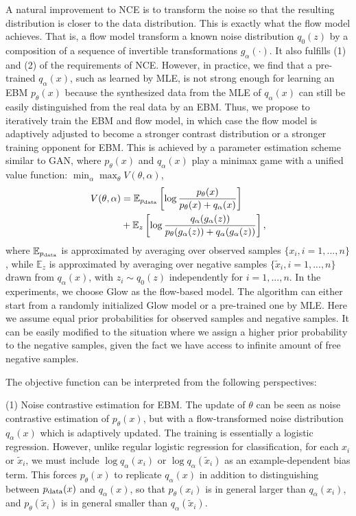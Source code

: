 \documentclass[10pt,twocolumn,letterpaper]{article}
\newcommand{\E}{\mathbb{E}}
\begin{document}
A natural improvement to NCE is to transform the noise so that the resulting distribution is closer to the data distribution. This is exactly what the flow model achieves. That is, a flow model transform a known noise distribution $q_0(z)$ by a composition of a sequence of invertible transformations $g_\alpha(\cdot)$. It also fulfills (1) and (2) of the requirements of NCE. However, in practice, we find that a pre-trained $q_\alpha(x)$, such as learned by MLE, is not strong enough for learning an EBM $p_\theta(x)$ because the synthesized data from the MLE of $q_\alpha(x)$ can still be easily distinguished from the real data by an EBM. Thus, we propose to iteratively train the EBM and flow model, in which case the flow model is adaptively adjusted to become a stronger contrast distribution or a stronger training opponent for EBM. This is achieved by a parameter estimation scheme similar to GAN, where $p_\theta(x)$ and $q_\alpha(x)$ play a minimax game with a unified value function: $ \min_{\alpha}\max_{\theta} V(\theta, \alpha)$, 
\begin{equation}
\begin{split}
	 V(\theta, \alpha) &=  \E_{p_{\rm data}}  \left[ \log \frac{p_\theta(x)}{p_\theta(x) +  q_\alpha(x)}\right] \\
	  &+  \E_{z}\left[\log \frac{q_\alpha(g_\alpha(z))}{p_\theta(g_\alpha(z)) + q_\alpha(g_\alpha(z))}\right],
\end{split}
\label{eqn: value}
\end{equation}
  where $\E_{p_{\rm data}}$ is approximated by averaging over observed samples $\{x_i, i = 1,...,n\}$, while $\E_z$ is approximated by averaging over negative samples $\{\tilde{x}_i, i = 1,...,n\}$ drawn from $q_\alpha(x)$, with $z_i \sim q_0(z)$ independently for $i = 1, ..., n$. In the experiments, we choose Glow \cite{kingma2018Glow} as the flow-based model. The algorithm can either start from a randomly initialized Glow model or a pre-trained one by MLE. Here we assume equal prior probabilities for observed samples and negative samples. It can be easily modified to the situation where we assign a higher prior probability to the negative samples, given the fact we have access to infinite amount of free negative samples. 

The objective function can be interpreted from the following perspectives:

(1) Noise contrastive estimation for EBM. The update of $\theta$ can be seen as noise contrastive estimation of $p_\theta(x)$, but with a flow-transformed noise distribution $q_\alpha(x)$ which is adaptively updated. The training is essentially a logistic regression. However, unlike regular logistic regression for classification, for each $x_i$ or $\tilde{x}_i$, we must include $\log q_\alpha(x_i)$ or $\log q_\alpha(\tilde{x}_i)$ as an example-dependent bias term. This forces $p_\theta(x)$ to replicate $q_\alpha(x)$ in addition to distinguishing between $p_{\rm data}(x)$ and $q_\alpha(x)$, so that $p_\theta(x_i)$ is in general larger than $q_\alpha(x_i)$, and $p_\theta(\tilde{x}_i)$ is in general smaller than $q_\alpha(\tilde{x}_i)$. 
\end{document}
